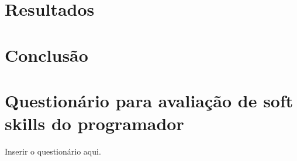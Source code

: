 \documentclass{ppgi}
\begin{document}
\listailustracoes

\listatabelas

\sumario

\elementostextuais




%





\chapter{Resultados}
\chapter{Conclusão}

\postextual



\apendices

\chapter{Questionário para avaliação de soft skills do programador}
\label{ap:tipi}

Inserir o questionário aqui.
\end{document}
